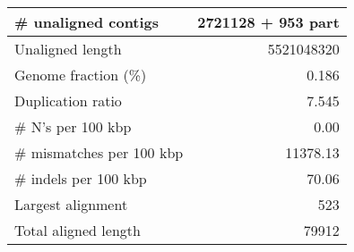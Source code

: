 \documentclass[12pt,a4paper]{article}
\begin{document}
\begin{table}[ht]
\begin{center}
\begin{tabular}{|l*{1}{|r}|}
\# unaligned contigs & 2721128 + 953 part \\ \hline
Unaligned length & 5521048320 \\ \hline
Genome fraction (\%) & 0.186 \\ \hline
Duplication ratio & 7.545 \\ \hline
\# N's per 100 kbp & 0.00 \\ \hline
\# mismatches per 100 kbp & 11378.13 \\ \hline
\# indels per 100 kbp & 70.06 \\ \hline
Largest alignment & 523 \\ \hline
Total aligned length & 79912 \\ \hline
\end{tabular}
\end{center}
\end{table}
\end{document}
